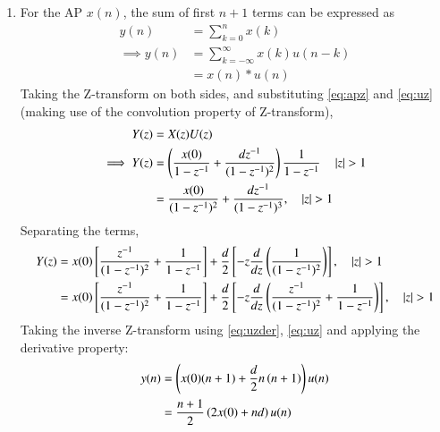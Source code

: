\documentclass[journal,12pt,onecolumn]{IEEEtran}
\theoremstyle{remark}
\begin{document}
\begin{enumerate}[label=\thechapter.\arabic*,ref=\thechapter.\theenumi]
\item For the AP $x(n)$, the sum of first $n+1$ terms can be expressed as
\begin{align}
y(n) &= \sum_{k=0}^{n} x(k)\\
\implies y(n) &= \sum_{k=-\infty}^{\infty} x(k) u(n-k)\\
&= x(n) * u(n)
\end{align}
Taking the Z-transform on both sides, and substituting \eqref{eq:apz} and \eqref{eq:uz} (making use of the convolution property of Z-transform),
\begin{align}
Y(z) &= X(z) U(z)\\
\implies Y(z) &= \left(\frac{x(0)}{1-z^{-1}} + \frac{dz^{-1}}{(1-z^{-1})^{2}}\right)\frac{1}{1-z^{-1}} \quad \left\vert z\right\vert > 1 \\
&= \frac{x(0)}{({1-z^{-1}})^2} + \frac{dz^{-1}}{(1-z^{-1})^{3}}, \quad \left\vert z\right\vert > 1
\end{align}
Separating the terms,
\begin{align}
Y(z) &= x(0) {}\left[\frac{z^{-1}}{({1-z^{-1}})^2} + \frac{1}{{1-z^{-1}}}\right] + \frac{d}{2}{}\left[-z\frac{d}{dz}\left(\frac{1}{(1-z^{-1})^{2}}\right)\right], \quad \left\vert z\right\vert > 1\\
&= x(0) {}\left[\frac{z^{-1}}{({1-z^{-1}})^2} + \frac{1}{{1-z^{-1}}}\right] + \frac{d}{2}{}\left[-z\frac{d}{dz}\left(\frac{z^{-1}}{({1-z^{-1}})^2} + \frac{1}{{1-z^{-1}}}\right)\right], \quad \left\vert z\right\vert > 1
\end{align}
Taking the inverse Z-transform using \eqref{eq:uzder}, \eqref{eq:uz} and applying the derivative property:
\begin{align}
y(n) &= \left(x(0)(n+1) + \frac{d}{2}n\left(n + 1\right)\right) u(n)\\
&= \frac{n+1}{2}\left(2x(0) + nd\right)u(n)
\end{align}
\end{enumerate}
\end{document}
